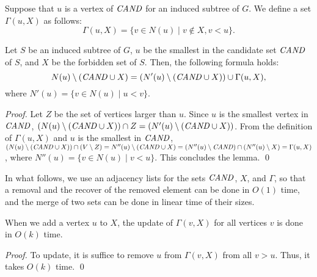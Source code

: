 \documentclass{llncs}
\newcommand{\inset}[2]{\{#1\;|\;#2\}}
\newcommand{\Can}{{\it CAND}}
\begin{document}
\begin{definition}
    Suppose that $u$ is a vertex of $\Can$ for an induced subtree of $G$. 
    We define a set $\Gamma(u, X)$ 
    as follows: 
    \begin{equation*}
        \Gamma(u, X) = \inset{v\in N(u)}{v \notin X, v < u}. 
    \end{equation*}
\end{definition}

\begin{lemma}
    \label{lem:mod:update:Can}
    Let $S$ be an induced subtree of $G$, 
    $u$ be the smallest in the candidate set $\Can$ of $S$, 
    and $X$ be the forbidden set of $S$. 
    Then, the following formula holds: 
    \begin{equation*}
         N(u) \setminus (\Can \cup X) 
     = (N'(u) \setminus (\Can \cup X)) \cup \Gamma(u, X), 
    \end{equation*}
    where $N'(u) = \inset{v \in N(u)}{u < v}$.  
\end{lemma}

\begin{proof}
    Let $Z$ be the set of vertices larger than $u$. 
    Since $u$ is the smallest vertex in $\Can$, 
    $(N(u)\setminus(\Can\cup X))\cap Z = (N'(u)\setminus (\Can\cup X))$. 
    From the definition of $\Gamma(u, X)$ 
    and $u$ is the smallest in 
    $\Can$, 
    $(N(u)\setminus(\Can\cup X))\cap(V\setminus Z) = N''(u)\setminus (\Can \cup X) = (N''(u) \setminus \Can) \cap (N''(u) \setminus X) = \Gamma(u, X)$, 
    where $N''(u) = \inset{v\in N(u)}{v < u}$. 
This concludes the lemma.
    \qed
\end{proof}


In what follows, 
we use an 
adjacency lists for the sets $\Can$, $X$, and $\Gamma$, 
so that a removal and the recover of the removed element 
can be done in $O(1)$ time, 
and the merge of two sets can be done in linear time of their sizes.


\begin{lemma}
    \label{lem:mod:update:X:neighbor}
    When we add a vertex $u$ to $X$, 
    the update of  $\Gamma(v, X)$ for all vertices $v$ is done in $O(k)$ time.
\end{lemma}

\begin{proof}
    To update, 
    it is suffice to remove $u$ from $\Gamma(v, X)$ from all $v>u$. 
    Thus, it takes $O(k)$ time.
    \qed
\end{proof}
\end{document}
